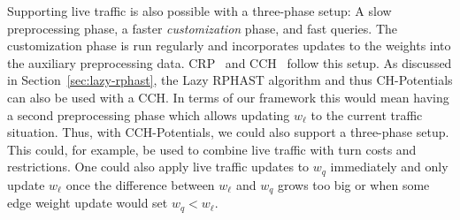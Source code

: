 \documentclass[manuscript,review]{acmart}
\begin{document}
Supporting live traffic is also possible with a three-phase setup:
A slow preprocessing phase, a faster \emph{customization} phase, and fast queries.
The customization phase is run regularly and incorporates updates to the weights into the auxiliary preprocessing data.
CRP~\cite{dgpw-crprn-13} and CCH~\cite{dsw-cch-15} follow this setup.
As discussed in Section~\ref{sec:lazy-rphast}, the Lazy RPHAST algorithm and thus CH-Potentials can also be used with a CCH.
In terms of our framework this would mean having a second preprocessing phase which allows updating $w_\ell$ to the current traffic situation.
Thus, with CCH-Potentials, we could also support a three-phase setup.
This could, for example, be used to combine live traffic with turn costs and restrictions.
One could also apply live traffic updates to $w_q$ immediately and only update $w_\ell$ once the difference between $w_\ell$ and $w_q$ grows too big or when some edge weight update would set $w_q < w_\ell$.



\end{document}
